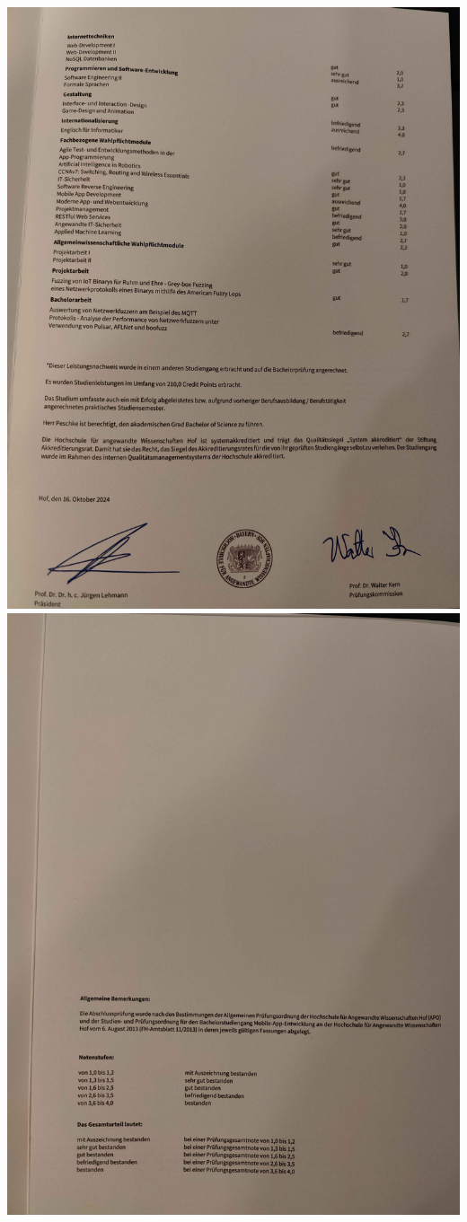 \documentclass[
    10pt, %
]{FreemanCV}
\begin{document}
    \newpage
    \includegraphics[page=3,scale=0.17]{./assets/B_Zeugnis02}
    \newpage
    \includegraphics[page=4,scale=0.17]{./assets/B_Zeugnis}
\end{document}

